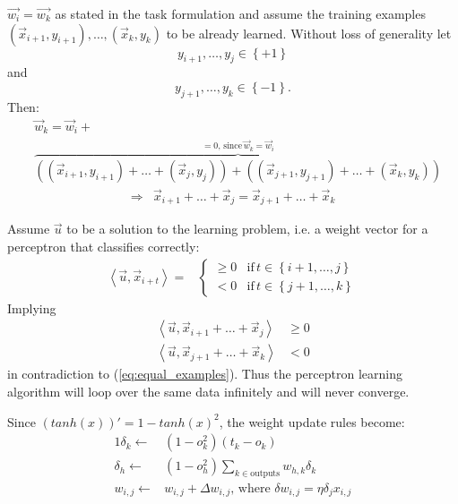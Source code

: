 \documentclass[10pt,a4paper,boxed]{hmcpset}
\begin{document}
	
		\begin{problem}
		\end{problem}
		\begin{solution}
			$\vec{w_i}=\vec{w_k}$ as stated in the task formulation and assume the training examples $\left(\vec{x}_{i+1},y_{i+1}\right),\ldots,\left(\vec{x}_{k},y_{k}\right)$ to be already learned. Without loss of generality let 
			\[y_{i+1},\ldots,y_{j} \in \left\{ +1 \right\}\] and \[y_{j+1},\ldots,y_{k} \in \left\{ -1 \right\}.\] Then:
			\begin{align*}
				& \vec{w}_k = \vec{w}_i + \\
				& \overbrace{\left( (\vec{x}_{i+1}, y_{i+1}) + \ldots + (\vec{x}_{j}, y_{j}) \right) + \left( (\vec{x}_{j+1},y_{j+1}) + \ldots + (\vec{x}_{k}, y_{k}) \right)}^{=0,\,\textrm{since}\, \vec{w}_k = \vec{w}_i}
			\end{align*}
			\begin{align}
				\Rightarrow & \vec{x}_{i+1} + \ldots + \vec{x}_{j} = \vec{x}_{j+1} + \ldots + \vec{x}_{k} \label{eq:equal_examples}
			\end{align}
			
			Assume $\vec{u}$ to be a solution to the learning problem, i.e. a weight vector for a perceptron that classifies correctly:
			\begin{align*}
				\left\langle \vec{u},\vec{x}_{i+t}\right\rangle = & \begin{cases}
																		\geq0 & \textrm{if}\,t\in\left\{ i+1,\ldots,j\right\} \\
																		   <0 & \textrm{if}\,t\in\left\{ j+1,\ldots,k\right\} 
																	\end{cases}
			\end{align*}
			Implying
			\begin{align*}
				\left\langle \vec{u},\vec{x}_{i+1} + \ldots + \vec{x}_{j}\right\rangle & \geq0 \\
				\left\langle \vec{u},\vec{x}_{j+1} + \ldots + \vec{x}_{k}\right\rangle & < 0
			\end{align*}
			in contradiction to (\ref{eq:equal_examples}). Thus the perceptron learning algorithm will loop over the same data infinitely and will never converge.
			
			
		\end{solution}		

		\begin{problem}
		\end{problem}
		\begin{solution}
			Since $(tanh(x))' = 1-tanh(x)^2$, the weight update rules become:
			\begin{alignat*}{1}
				\delta_k \leftarrow & \left( 1-o_k^2 \right) \left( t_k - o_k \right) \\
				\delta_h \leftarrow & \left( 1-o_h^2 \right) \sum_{k \in \textrm{outputs}} w_{h,k} \delta_k \\
				w_{i,j} \leftarrow & w_{i,j} + \Delta w_{i,j},\,\mbox{where } \delta w_{i,j} = \eta \delta_j x_{i,j}
			\end{alignat*}
		\end{solution}		
		
\end{document}
